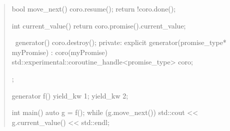\begin{quote}
\begin{codeblock}
{    bool move_next() {
      coro.resume();
      return !coro.done();
    }
    
    int current_value() { return coro.promise().current_value; }
    
    ~generator() { coro.destroy(); }
  private:
    explicit generator(promise_type* myPromise) : coro(myPromise) 
    {
    }
    std::experimental::coroutine_handle<promise_type> coro;
  };
  
  generator f() {
    yield_kw 1;
    yield_kw 2;
  } 
  
  int main() {
    auto g = f();
    while (g.move_next()) std::cout << g.current_value() << std::endl;
  }
  
\end{codeblock}
\exitexample

\end{quote}
